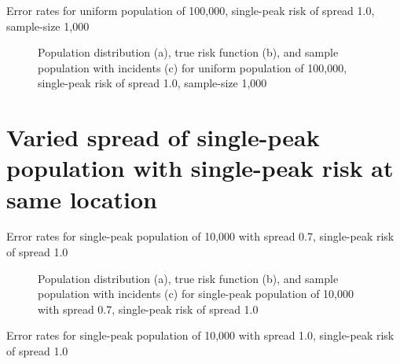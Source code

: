 {\begin{table}[H]
    
    \caption[]{Error rates for uniform population of 100,000, single-peak risk of \gls{spread} 1.0, sample-size 1,000}
    \label{tab:mean_error_rates:unif100k_1000_1.0_1h}
\end{table}

\begin{figure}[H]
    
    \caption[]{Population distribution (a), true risk function (b), and sample population with incidents (c) for uniform population of 100,000, single-peak risk of \gls{spread} 1.0, sample-size 1,000}
    \label{fig:distributions:unif100k_1000_1.0_1h}    
\end{figure} \newpage



\section{Varied spread of single-peak population with single-peak risk at same location}
\label{sec:app:results_pX_100_1.0_1h}


\begin{table}[H]
    
    \caption[]{Error rates for single-peak population of 10,000 with \gls{spread} 0.7, single-peak risk of \gls{spread} 1.0}
    \label{tab:mean_error_rates:p0.7_100_1.0_1h}
\end{table}

\begin{figure}[H]
    
    \caption[]{Population distribution (a), true risk function (b), and sample population with incidents (c) for single-peak population of 10,000 with \gls{spread} 0.7, single-peak risk of \gls{spread} 1.0}
    \label{fig:distributions:p0.7_100_1.0_1h}    
\end{figure} \newpage


\begin{table}[H]
    
    \caption[]{Error rates for single-peak population of 10,000 with \gls{spread} 1.0, single-peak risk of \gls{spread} 1.0}
    \label{tab:mean_error_rates:p1.0_100_1.0_1h}
\end{table}

}
